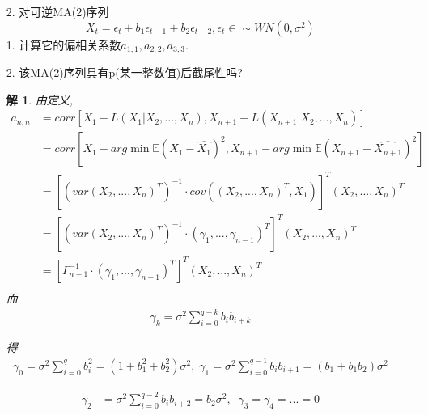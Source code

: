 \documentclass[11pt,a4paper]{ctexart}
\newtheorem*{solution}{解}
\begin{document}
\begin{enumerate}
\item[2.]对可逆MA(2)序列
\begin{equation}
	X_t=\epsilon_t+b_1\epsilon_{t-1}+b_2\epsilon_{t-2}, \epsilon_t\in\sim WN(0,\sigma^2)
\end{equation}
1. 计算它的偏相关系数$ a_{1,1},a_{2,2},a_{3,3} $.

2. 该MA(2)序列具有p(某一整数值)后截尾性吗?
\begin{solution}
由定义,
\begin{equation}
\begin{aligned}
a_{n,n} 
&= corr[X_1-L(X_1|X_2,...,X_n),X_{n+1}-L(X_{n+1}|X_2,...,X_n)]\\
&= corr[X_1-arg\min\mathbb{E}(X_1-\hat{X_1})^2,X_{n+1}-arg\min\mathbb{E}(X_{n+1}-\hat{X_{n+1}})^2]\\
&= [(var(X_2,...,X_n)^T)^{-1}\cdot cov((X_2,...,X_n)^T,X_1)]^T(X_2,...,X_n)^T\\
&= [(var(X_2,...,X_n)^T)^{-1}\cdot (\gamma_1,...,\gamma_{n-1})^T]^T(X_2,...,X_n)^T\\
&= [\Gamma_{n-1}^{-1}\cdot (\gamma_1,...,\gamma_{n-1})^T]^T(X_2,...,X_n)^T\\ 
\end{aligned} 
\end{equation}
而
\begin{equation}
\begin{aligned}
\gamma_k=\sigma^2\sum_{i=0}^{q-k}b_ib_{i+k}
\end{aligned} 
\end{equation}

得
\begin{equation}
\begin{aligned}
\gamma_0
= \sigma^2\sum_{i=0}^{q}b_i^2=(1+b_1^2+b_2^2)\sigma^2,\;\gamma_1
= \sigma^2\sum_{i=0}^{q-1}b_ib_{i+1}=(b_1+b_1b_2)\sigma^2
\end{aligned} 
\end{equation}

\begin{equation}
	\begin{aligned}
		\gamma_2
		&= \sigma^2\sum_{i=0}^{q-2}b_ib_{i+2}=b_2\sigma^2,\;\;\gamma_3=\gamma_4=...= 0
	\end{aligned} 
\end{equation}


\end{solution}
\end{enumerate}
\end{document}
